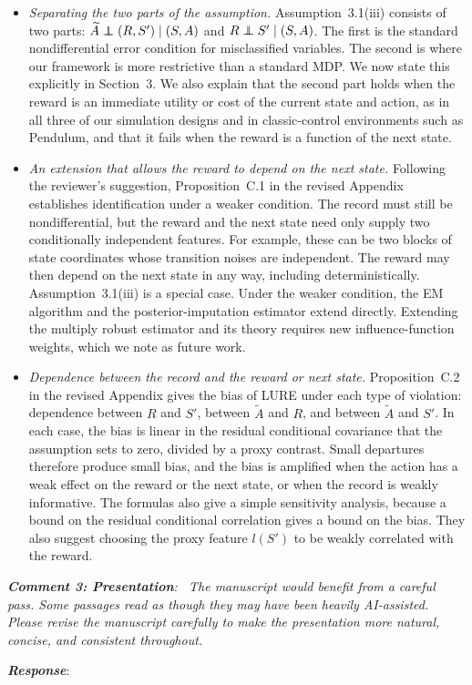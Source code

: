 \documentclass[12pt]{article}
\newcommand\independent{\protect\mathpalette{\protect\independenT}{\perp}}
\def\independenT#1#2{\mathrel{\rlap{$#1#2$}\mkern2mu{#1#2}}}
\newcommand{\0}{\boldsymbol{0}}
\theoremstyle{definition}
\newcommand{\reviewcomment}[1]{\par\begingroup\itshape\noindent\textbf{#1}:\ }
\newcommand{\reviewresponse}{\par\endgroup\noindent\textbf{\textit{Response}}:\ }
\begin{document}
\begin{itemize}
    \item \textit{Separating the two parts of the assumption.} Assumption~3.1(iii) consists of two parts: $\widetilde A\independent (R,S')\mid (S,A)$ and $R\independent S'\mid (S,A)$. The first is the standard nondifferential error condition for misclassified variables. The second is where our framework is more restrictive than a standard MDP. We now state this explicitly in Section~3. We also explain that the second part holds when the reward is an immediate utility or cost of the current state and action, as in all three of our simulation designs and in classic-control environments such as Pendulum, and that it fails when the reward is a function of the next state.
    \item \textit{An extension that allows the reward to depend on the next state.} Following the reviewer's suggestion, Proposition~C.1 in the revised Appendix establishes identification under a weaker condition. The record must still be nondifferential, but the reward and the next state need only supply two conditionally independent features. For example, these can be two blocks of state coordinates whose transition noises are independent. The reward may then depend on the next state in any way, including deterministically. Assumption~3.1(iii) is a special case. Under the weaker condition, the EM algorithm and the posterior-imputation estimator extend directly. Extending the multiply robust estimator and its theory requires new influence-function weights, which we note as future work.
    \item \textit{Dependence between the record and the reward or next state.} Proposition~C.2 in the revised Appendix gives the bias of LURE under each type of violation: dependence between $R$ and $S'$, between $\widetilde A$ and $R$, and between $\widetilde A$ and $S'$. In each case, the bias is linear in the residual conditional covariance that the assumption sets to zero, divided by a proxy contrast. Small departures therefore produce small bias, and the bias is amplified when the action has a weak effect on the reward or the next state, or when the record is weakly informative. The formulas also give a simple sensitivity analysis, because a bound on the residual conditional correlation gives a bound on the bias. They also suggest choosing the proxy feature $l(S')$ to be weakly correlated with the reward.
\end{itemize}

\reviewcomment{Comment 3: Presentation} The manuscript would benefit from a careful pass. Some passages read as though they may have been heavily AI-assisted. Please revise the manuscript carefully to make the presentation more natural, concise, and consistent throughout.
\reviewresponse




\end{document}
